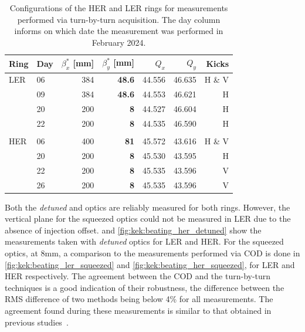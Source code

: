 \begin{table}
    \centering
    \begin{tabular}{llrrrrr}
    \hline
    Ring & Day & $\beta_x^*$ [mm] & $\beta_y^*$ [mm] & $Q_x$ & $Q_y$ & Kicks\\
    \hline
    LER        & 06 & 384 &\textbf{48.6} & 44.556 & 46.635 & H \& V \\
               & 09 & 384 &\textbf{48.6} & 44.553 & 46.621 & H  \\
               \hdashline
               & 20 & 200 & \textbf{8}   & 44.527 & 46.604 & H \\
               & 22 & 200 & \textbf{8}   & 44.535 & 46.590 & H \\
               &&&&&& \\
    HER        & 06 & 400 & \textbf{81}  & 45.572 & 43.616 & H \& V\\
               \hdashline
               & 20 & 200 & \textbf{8} & 45.530 & 43.595 & H \\
               & 22 & 200 & \textbf{8} & 45.535 & 43.596 & V \\
               & 26 & 200 & \textbf{8} & 45.535 & 43.596 & V \\
    \bottomrule
    \end{tabular}
  \caption{Configurations of the HER and LER rings for measurements performed via turn-by-turn
  acquisition. The day column informs on which date the measurement was performed in February 2024.}
  \label{tab:superkekb:configurations}
\end{table}

Both the \textit{detuned} and  optics are reliably measured for both rings.
However, the vertical plane for the squeezed optics could not be measured in LER due to the absence
of injection offset.
 and \cref{fig:kek:beating_her_detuned} show the measurements
taken with \textit{detuned} optics for LER and HER. For the squeezed optics, at 8mm, a comparison to
the measurements performed via COD is done in \cref{fig:kek:beating_ler_squeezed} and
\cref{fig:kek:beating_her_squeezed}, for LER and HER respectively. The agreement between the COD
and the turn-by-turn techniques is a good indication of their robustness, the difference between the
RMS difference of two methods being below 4\% for all measurements. The agreement found during these
measurements is similar to that obtained in previous studies~\cite{keintzel_jacqueline_beam_2022}.




